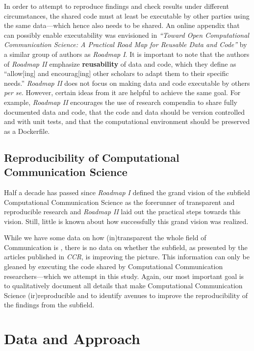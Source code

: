 In order to attempt to reproduce findings and check results under different circumstances, the shared code must at least be executable by other parties using the same data---which hence also needs to be shared.
An online appendix that can possibly enable executability was envisioned in \textit{``Toward Open Computational Communication Science: A Practical Road Map for Reusable Data and Code''} \parencite[\textit{Roadmap II} hereinafter]{van2019computational} by a similar group of authors as \textit{Roadmap I}. It is important to note that the authors of \textit{Roadmap II} emphasize \textbf{reusability} of data and code, which they define as ``allow[ing] and encourag[ing] other scholars to adapt them to their specific needs.''  \textit{Roadmap II} does not focus on making data and code executable by others \textit{per se}. However, certain ideas from it are helpful to achieve the same goal. For example, \textit{Roadmap II} encourages the use of research compendia to share fully documented data and code, that the code and data should be version controlled and with unit tests, and that the computational environment should be preserved as a Dockerfile.

\subsection{Reproducibility of Computational Communication Science}

Half a decade has passed since \textit{Roadmap I} defined the grand vision of the subfield Computational Communication Science as the forerunner of transparent and reproducible research and \textit{Roadmap II} laid out the practical steps towards this vision. Still, little is known about how successfully this grand vision was realized.

While we have some data on how (in)transparent the whole field of Communication is \parencite[]{haim:2023:H,markowitz:2021:TAE,Knoepfle2024}, there is no data on whether the subfield, as presented by the articles published in \textit{CCR}, is improving the picture.
This information can only be gleaned by executing the code shared by Computational Communication researchers---which we attempt in this study.
Again, our most important goal is to qualitatively document all details that make Computational Communication Science (ir)reproducible and to identify avenues to improve the reproducibility of the findings from the subfield.

\section{Data and Approach}

